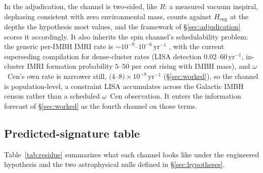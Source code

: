 \documentclass[11pt]{article}
\newcommand{\ocen}{\ensuremath{\omega}~Cen}
\newcommand{\Heng}{\ensuremath{H_{\mathrm{eng}}}}
\begin{document}
In the adjudication, the channel is two-sided, like $R$: a measured vacuum inspiral, dephasing consistent with zero environmental mass, counts against \Heng{} at the depths the hypothesis most values, and the framework of \S\ref{sec:adjudication} scores it accordingly. It also inherits the spin channel's schedulability problem: the generic per-IMBH IMRI rate is $\sim 10^{-9}$--$10^{-6}\,\mathrm{yr^{-1}}$ \citep{Mandel2008,AmaroSeoane2018,Fragione2018}, with \citet{ArcaSedda2021} the current superseding compilation for dense-cluster rates (LISA detection $0.02$--$60\,\mathrm{yr^{-1}}$, in-cluster IMRI formation probability $5$--$50$ per cent rising with IMBH mass), and \ocen's own rate is narrower still, $(4$--$8)\times10^{-8}\,\mathrm{yr^{-1}}$ (\S\ref{sec:worked}), so the channel is population-level, a constraint LISA accumulates across the Galactic IMBH census rather than a scheduled \ocen{} observation. It enters the information forecast of \S\ref{sec:worked} as the fourth channel on those terms.

\subsection{Predicted-signature table}
\label{sec:nulltable}

Table~\ref{tab:residue} summarizes what each channel looks like under the engineered hypothesis and the two astrophysical nulls defined in \S\ref{sec:hypotheses}.
\end{document}
